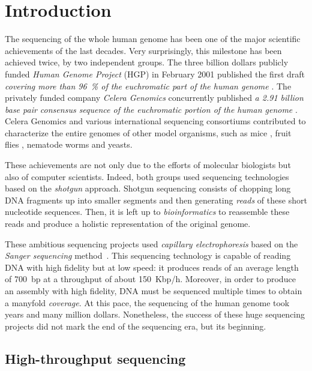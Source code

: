 \chapter{Introduction}

The sequencing of the whole human genome has been one of the major scientific achievements of the last decades.
Very surprisingly, this milestone has been achieved twice, by two independent groups.
The three billion dollars publicly funded \emph{Human Genome Project} (HGP) in February 2001 published the first draft \emph{covering more than 96~\% of the euchromatic part of the human genome} \citep{Consortium2001}.
The privately funded company \emph{Celera Genomics} concurrently published \emph{a 2.91 billion base pair consensus sequence of the euchromatic portion of the human genome} \citep{Venter2001}.
Celera Genomics and various international sequencing consortiums contributed to characterize the entire genomes of other model organisms, such as mice \citep{Chinwalla2002}, fruit flies \citep{Myers2000}, nematode worms \citep{Sulston1992} and yeasts.

These achievements are not only due to the efforts of molecular biologists but also of computer scientists.
Indeed, both groups used sequencing technologies based on the \emph{shotgun} approach.
Shotgun sequencing consists of chopping long DNA fragments up into smaller segments and then generating \emph{reads} of these short nucleotide sequences.
Then, it is left up to \emph{bioinformatics} to reassemble these reads and produce a holistic representation of the original genome.

These ambitious sequencing projects used \emph{capillary electrophoresis} based on the \emph{Sanger sequencing} method~\citep{Sanger1977}.
This sequencing technology is capable of reading DNA with high fidelity but at low speed: it produces reads of an average length of 700~bp at a throughput of about 150~Kbp/h.
Moreover, in order to produce an assembly with high fidelity, DNA must be sequenced multiple times to obtain a manyfold \emph{coverage}.
At this pace, the sequencing of the human genome took years and many million dollars.
Nonetheless, the success of these huge sequencing projects did not mark the end of the sequencing era, but its beginning.


\section{High-throughput sequencing}

